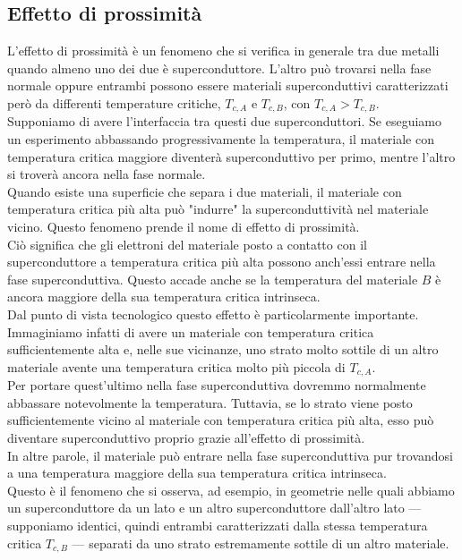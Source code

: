 \subsection{Effetto di prossimità}
L'effetto di prossimità è un fenomeno che si verifica in generale tra due metalli quando almeno uno dei due è superconduttore. L'altro può trovarsi nella fase normale oppure entrambi possono essere materiali superconduttivi caratterizzati però da differenti temperature critiche, $T_{c,A}$ e $T_{c,B}$, con $T_{c,A}>T_{c,B}$.\\
Supponiamo di avere l'interfaccia tra questi due superconduttori. Se eseguiamo un esperimento abbassando progressivamente la temperatura, il materiale con temperatura critica maggiore diventerà superconduttivo per primo, mentre l'altro si troverà ancora nella fase normale.\\
Quando esiste una superficie che separa i due materiali, il materiale con temperatura critica più alta può "indurre" la superconduttività nel materiale vicino. Questo fenomeno prende il nome di effetto di prossimità.\\
Ciò significa che gli elettroni del materiale posto a contatto con il superconduttore a temperatura critica più alta possono anch'essi entrare nella fase superconduttiva. Questo accade anche se la temperatura del materiale $B$ è ancora maggiore della sua temperatura critica intrinseca.\\
Dal punto di vista tecnologico questo effetto è particolarmente importante. Immaginiamo infatti di avere un materiale con temperatura critica sufficientemente alta e, nelle sue vicinanze, uno strato molto sottile di un altro materiale avente una temperatura critica molto più piccola di $T_{c,A}$.\\
Per portare quest'ultimo nella fase superconduttiva dovremmo normalmente abbassare notevolmente la temperatura. Tuttavia, se lo strato viene posto sufficientemente vicino al materiale con temperatura critica più alta, esso può diventare superconduttivo proprio grazie all'effetto di prossimità.\\
In altre parole, il materiale può entrare nella fase superconduttiva pur trovandosi a una temperatura maggiore della sua temperatura critica intrinseca.\\
Questo è il fenomeno che si osserva, ad esempio, in geometrie nelle quali abbiamo un superconduttore da un lato e un altro superconduttore dall'altro lato — supponiamo identici, quindi entrambi caratterizzati dalla stessa temperatura critica $T_{c,B}$ — separati da uno strato estremamente sottile di un altro materiale.\\
